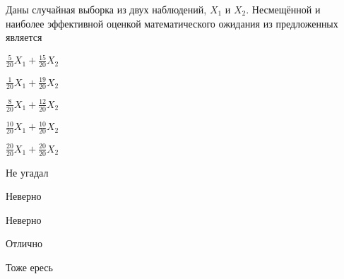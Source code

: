 
\begin{question}
Даны случайная выборка из двух наблюдений, \(X_1\) и \(X_2\).
Несмещённой и наиболее эффективной оценкой математического ожидания из
предложенных является
\begin{answerlist}
  \item \(\frac{5}{20}X_1 + \frac{15}{20}X_2\)
  \item \(\frac{1}{20}X_1 + \frac{19}{20}X_2\)
  \item \(\frac{8}{20}X_1 + \frac{12}{20}X_2\)
  \item \(\frac{10}{20}X_1 + \frac{10}{20}X_2\)
  \item \(\frac{20}{20}X_1 + \frac{20}{20}X_2\)
\end{answerlist}
\end{question}

\begin{solution}
\begin{answerlist}
  \item Не угадал
  \item Неверно
  \item Неверно
  \item Отлично
  \item Тоже ересь
\end{answerlist}
\end{solution}

